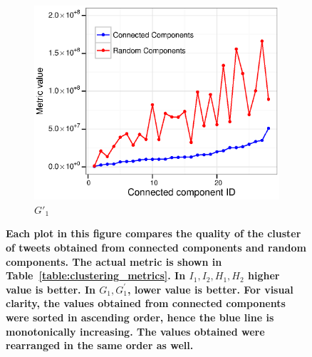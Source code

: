 \documentclass[10pt,letterpaper]{article}
\begin{document}
\begin{figure}
\begin{subfigure}[b]{0.3\textwidth}
    \includegraphics[width=\textwidth]{figures_SI/Plots_from_data/cc_validation/G1P.eps}
    \caption{$G'_1$} \label{fig:G1P}
  \end{subfigure}

  \caption{\textbf{Each plot in this figure compares the
          quality of the cluster of tweets obtained from connected
          components and random components. The actual metric is shown
          in Table~\ref{table:clustering_metrics}. In $I_1, I_2, H_1,
          H_2$ higher value is better. In $G_1, G_1^{'}$, lower value
          is better. For visual clarity, the values obtained from
          connected components were sorted in ascending order, hence
          the blue line is monotonically increasing. The values
          obtained were rearranged in the same order as well.}}
    \label{fig:connected_components_validation}
\end{figure}
\end{document}
